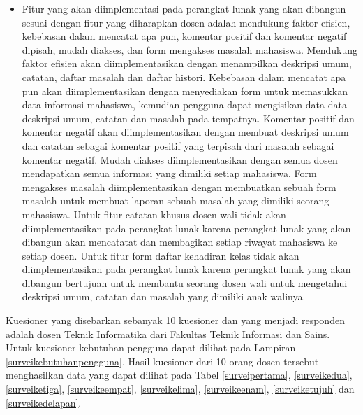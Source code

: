 \begin{itemize}
\item Fitur yang akan diimplementasi pada perangkat lunak yang akan dibangun sesuai dengan fitur yang diharapkan dosen adalah mendukung faktor efisien, kebebasan dalam mencatat apa pun, komentar positif dan komentar negatif dipisah, mudah diakses, dan form mengakses masalah mahasiswa. Mendukung faktor efisien akan diimplementasikan dengan menampilkan deskripsi umum, catatan, daftar masalah dan daftar histori. Kebebasan dalam mencatat apa pun akan diimplementasikan dengan menyediakan form untuk memasukkan data informasi mahasiswa, kemudian pengguna dapat mengisikan data-data deskripsi umum, catatan dan masalah pada tempatnya. Komentar positif dan komentar negatif akan diimplementasikan dengan membuat deskripsi umum dan catatan sebagai komentar positif yang terpisah dari masalah sebagai komentar negatif. Mudah diakses diimplementasikan dengan semua dosen mendapatkan semua informasi yang dimiliki setiap mahasiswa. Form mengakses masalah diimplementasikan dengan membuatkan sebuah form masalah untuk membuat laporan sebuah masalah yang dimiliki seorang mahasiswa. Untuk fitur catatan khusus dosen wali tidak akan diimplementasikan pada perangkat lunak karena perangkat lunak yang akan dibangun akan mencatatat dan membagikan setiap riwayat mahasiswa ke setiap dosen. Untuk fitur form daftar kehadiran kelas tidak akan diimplementasikan pada perangkat lunak karena perangkat lunak yang akan dibangun bertujuan untuk membantu seorang dosen wali untuk mengetahui deskripsi umum, catatan dan masalah yang dimiliki anak walinya.
\end{itemize}

Kuesioner yang disebarkan sebanyak 10 kuesioner dan yang menjadi responden adalah dosen Teknik Informatika dari Fakultas Teknik Informasi dan Sains. Untuk kuesioner kebutuhan pengguna dapat dilihat pada Lampiran \ref{surveikebutuhanpengguna}. Hasil kuesioner dari 10 orang dosen tersebut menghasilkan data yang dapat dilihat pada Tabel \ref{surveipertama}, \ref{surveikedua}, \ref{surveiketiga}, \ref{surveikeempat}, \ref{surveikelima}, \ref{surveikeenam}, \ref{surveiketujuh} dan \ref{surveikedelapan}.

